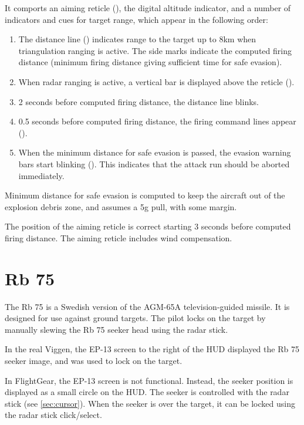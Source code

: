 It comports an aiming reticle (),
the digital altitude indicator, and a number of indicators and cues for target range,
which appear in the following order:
\begin{enumerate}
  \item The distance line ()
    indicates range to the target up to 8km when triangulation ranging is active.
    The side marks indicate the computed firing distance
    (minimum firing distance giving sufficient time for safe evasion).
  \item When radar ranging is active, a vertical bar is displayed above the reticle
    ().
  \item 2 seconds before computed firing distance, the distance line blinks.
  \item 0.5 seconds before computed firing distance, the firing command lines appear
    ().
  \item When the minimum distance for safe evasion is passed,
    the evasion warning bars start blinking ().
    This indicates that the attack run should be aborted immediately.
\end{enumerate}

Minimum distance for safe evasion is computed to keep the aircraft out of the
explosion debris zone, and assumes a 5g pull, with some margin.

The position of the aiming reticle is correct starting 3 seconds before computed firing distance.
The aiming reticle includes wind compensation.


\section{Rb 75}
The Rb 75 is a Swedish version of the AGM-65A television-guided missile.
It is designed for use against ground targets.
The pilot locks on the target by manually slewing the Rb 75 seeker head using the radar stick.

In the real Viggen, the EP-13 screen to the right of the HUD displayed the Rb
75 seeker image, and was used to lock on the target.

In FlightGear, the EP-13 screen is not functional.
Instead, the seeker position is displayed as a small circle on the HUD.
The seeker is controlled with the radar stick (see \cref{sec:cursor}).
When the seeker is over the target, it can be locked using the radar stick click/select.

